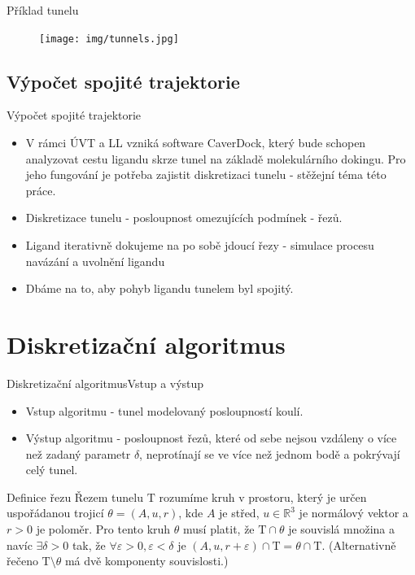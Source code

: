 \documentclass{beamer}
\newcommand{\Rbb}{\mathbb{R}}
\newcommand{\Tau}{\mathrm{T}}
\begin{document}
\begin{frame}{Příklad tunelu}
    \begin{figure}
        \texttt{[image: img/tunnels.jpg]}
    \end{figure}
\end{frame}

\subsection{Výpočet spojité trajektorie}
\begin{frame}{Výpočet spojité trajektorie}
  \begin{itemize}
  \item  V rámci ÚVT a LL vzniká software CaverDock, který bude schopen analyzovat cestu ligandu skrze tunel na základě molekulárního dokingu. Pro jeho fungování je potřeba zajistit diskretizaci tunelu - stěžejní téma této práce.
  \item Diskretizace tunelu - posloupnost omezujících podmínek - řezů.
 	\item Ligand iterativně dokujeme na po sobě jdoucí řezy - simulace procesu navázání a uvolnění ligandu
 	\item Dbáme na to, aby pohyb ligandu tunelem byl spojitý.
  \end{itemize}
\end{frame}

\section{Diskretizační algoritmus}

\begin{frame}{Diskretizační algoritmus}{Vstup a výstup}
\begin{itemize}
	\item Vstup algoritmu - tunel modelovaný posloupností koulí.
	\item Výstup algoritmu - posloupnost řezů, které od sebe nejsou vzdáleny o více než zadaný parametr $ \delta $, neprotínají se ve více než jednom bodě a pokrývají celý tunel.
\end{itemize}

\begin{block}{Definice řezu}
Řezem tunelu $ \Tau $ rozumíme kruh v prostoru, který je určen uspořádanou trojicí
$\theta = (A, u, r)$, kde $ A $ je střed, $ u \in \Rbb^3 $ je normálový vektor a $ r > 0 $ je poloměr.
Pro tento kruh $ \theta $ musí platit, že $ \Tau \cap \theta $ je souvislá množina a navíc
$ \exists \delta > 0 $ tak, že $ \forall \varepsilon > 0,  \varepsilon < \delta $ je
$ (A, u, r + \varepsilon) \cap \Tau = \theta \cap \Tau $.
(Alternativně řečeno $\Tau \setminus \theta $ má dvě komponenty souvislosti.)
\end{block}

\end{frame}
\end{document}
